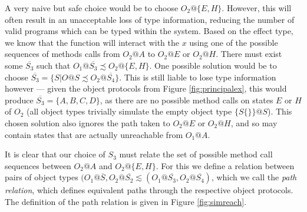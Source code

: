 \documentclass[preprint]{sigplanconf}
\makeatletter
\newcommand{\figref}[1]{Figure \ref{#1}}
\newcommand{\ot}[2]{#1@\overline{#2}}
\makeatother
\begin{document}
A very naive but safe choice would be to choose $O_2@\{E,H\}$. However,
this will often result in an unacceptable loss of type information,
reducing the number of valid programs which can be typed within the system.
Based on the effect type,
we know that the function will interact with the $x$ using
one of the possible sequences of methods calls from $O_2@A$ to 
$O_2@E$ or $O_2@H$. There must exist some
$\overline{S_3}$ such that $\ot{O_1}{S_3} \precsim O_2@\{E,H\}$.
One possible solution would be to choose
$\overline{S_3} = \{ S | O@S \precsim \ot{O_2}{S_4} \}$. 
This is still liable to lose type information however --- given the object 
protocols from \figref{fig:principalex}, this would produce
$\overline{S_3} = \{ A, B, C, D \}$, as there are no possible method calls
on states $E$ or $H$ of $O_2$ (all object types trivially simulate the
empty object type $\{ S\{\} \}@S$). This chosen solution also ignores the
path taken to $O_2@E$ or $O_2@H$, and so may contain states
that are actually unreachable from $O_1@A$.

It is clear that our choice of $S_3$ must relate the set of possible method
call sequences between $O_2@A$ and $O_2@\{E,H\}$. For this we
define a relation between pairs of object types
$(O_1@\overline{S}, O_2@\overline{S_2} \lesssim 
(O_1@\overline{S_3}, O_2@\overline{S_4})$, which we call the
{\it path relation}, which defines equivalent paths through the
respective object protocols. The definition of the path relation
is given in \figref{fig:simreach}. 
\end{document}
